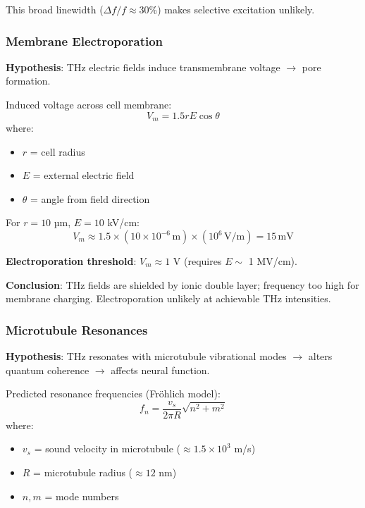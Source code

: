 This broad linewidth ($\Delta f / f \approx 30$\%) makes selective excitation unlikely.

\subsubsection{Membrane Electroporation}

\textbf{Hypothesis}: THz electric fields induce transmembrane voltage $\rightarrow$ pore formation.

Induced voltage across cell membrane:
\begin{equation}
V_m = 1.5 r E \cos\theta
\end{equation}
where:
\begin{itemize}
\item $r$ = cell radius
\item $E$ = external electric field
\item $\theta$ = angle from field direction
\end{itemize}

For $r = 10$ µm, $E = 10$ kV/cm:
\begin{equation}
V_m \approx 1.5 \times (10 \times 10^{-6}\,\text{m}) \times (10^6\,\text{V/m}) = 15\,\text{mV}
\end{equation}

\textbf{Electroporation threshold}: $V_m \approx 1$ V (requires $E \sim$ 1 MV/cm).

\textbf{Conclusion}: THz fields are shielded by ionic double layer; frequency too high for membrane charging. Electroporation unlikely at achievable THz intensities.

\subsubsection{Microtubule Resonances}

\textbf{Hypothesis}: THz resonates with microtubule vibrational modes $\rightarrow$ alters quantum coherence $\rightarrow$ affects neural function.

Predicted resonance frequencies (Fröhlich model):
\begin{equation}
f_n = \frac{v_s}{2\pi R} \sqrt{n^2 + m^2}
\end{equation}
where:
\begin{itemize}
\item $v_s$ = sound velocity in microtubule ($\approx 1.5 \times 10^3$ m/s)
\item $R$ = microtubule radius ($\approx 12$ nm)
\item $n, m$ = mode numbers
\end{itemize}

